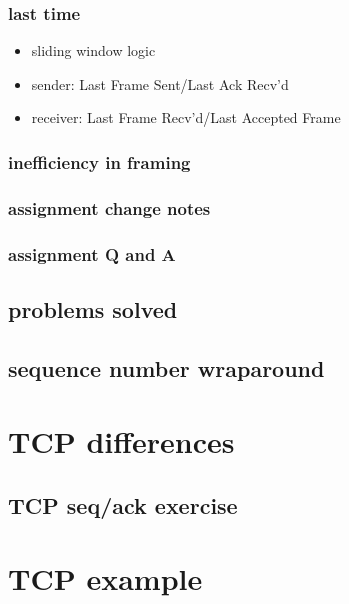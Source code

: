 \date{}
\title{}
\date{}
\usepackage{pgfplots}
\pgfplotsset{compat=1.16}

\begin{frame}
    \titlepage
\end{frame}

\begin{frame}
\frametitle{last time}
\begin{itemize}
\item sliding window logic
\item sender: Last Frame Sent/Last Ack Recv'd
\item receiver: Last Frame Recv'd/Last Accepted Frame
\end{itemize}
\end{frame}

\begin{frame}
\frametitle{inefficiency in framing}
\end{frame}

\begin{frame}
\frametitle{assignment change notes}
\end{frame}

\begin{frame}
\frametitle{assignment Q and A}
\end{frame}

\subsection{problems solved}


\subsection{sequence number wraparound}


\section{TCP differences}


\subsection{TCP seq/ack exercise}


\section{TCP example}

